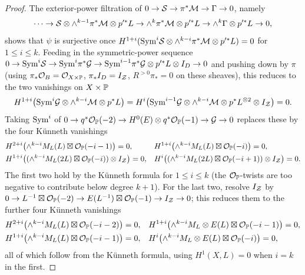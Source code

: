 \begin{proof}
  The exterior-power filtration of \(0\to\mathcal{S}\to\pi^*\mathcal{M}\to\Gamma\to0\), namely
  \[
    \dots\to\mathcal{S}\otimes\wedge^{k-1}\pi^*\mathcal{M}\otimes p'^*L
      \to\wedge^k\pi^*\mathcal{M}\otimes p'^*L\to\wedge^k\Gamma\otimes p'^*L\to0 ,
  \]
  shows that \(\psi\) is surjective once
  \(H^{1+i}(\mathrm{Sym}^i\mathcal{S}\otimes\wedge^{k-i}\pi^*\mathcal{M}\otimes p'^*L)=0\) for
  \(1\le i\le k\).  Feeding in the symmetric-power sequence
  \(0\to\mathrm{Sym}^i\mathcal{S}\to\mathrm{Sym}^i\pi^*\mathcal{G}\to\mathrm{Sym}^{i-1}\pi^*\mathcal{G}\otimes p'^*L\otimes I_D\to0\)
  and pushing down by \(\pi\) (using \(\pi_*\mathcal{O}_B=\mathcal{O}_{X\times\mathbb{P}}\),
  \(\pi_*I_D=I_{\mathcal{Z}}\), \(R^{>0}\pi_*=0\) on these sheaves), this reduces to the
  two vanishings on \(X\times\mathbb{P}\)
  \[
    H^{1+i}\bigl(\mathrm{Sym}^i\mathcal{G}\otimes\wedge^{k-i}\mathcal{M}\otimes p^*L\bigr)
      =H^i\bigl(\mathrm{Sym}^{i-1}\mathcal{G}\otimes\wedge^{k-i}\mathcal{M}\otimes p^*L^{\otimes2}
       \otimes I_{\mathcal{Z}}\bigr)=0 .
  \]
  Taking \(\mathrm{Sym}^i\) of
  \(0\to q^*\mathcal{O}_{\mathbb{P}}(-2)\to H^0(E)\otimes q^*\mathcal{O}_{\mathbb{P}}(-1)\to\mathcal{G}\to0\) replaces
  these by the four Künneth vanishings
  \begin{align*}
    &H^{2+i}\bigl(\wedge^{k-i}M_L(L)\boxtimes\mathcal{O}_{\mathbb{P}}(-i-1)\bigr)=0,
    &&H^{1+i}\bigl(\wedge^{k-i}M_L(L)\boxtimes\mathcal{O}_{\mathbb{P}}(-i)\bigr)=0,\\
    &H^{1+i}\bigl((\wedge^{k-i}M_L(2L)\boxtimes\mathcal{O}_{\mathbb{P}}(-i))\otimes I_{\mathcal{Z}}\bigr)=0,
    &&H^i\bigl((\wedge^{k-i}M_L(2L)\boxtimes\mathcal{O}_{\mathbb{P}}(-i+1))\otimes I_{\mathcal{Z}}\bigr)=0.
  \end{align*}
  The first two hold by the Künneth formula for \(1\le i\le k\) (the
  \(\mathcal{O}_{\mathbb{P}}\)-twists are too negative to contribute below degree \(k+1\)).  For
  the last two, resolve \(I_{\mathcal{Z}}\) by
  \(0\to L^{-1}\boxtimes\mathcal{O}_{\mathbb{P}}(-2)\to E(L^{-1})\boxtimes\mathcal{O}_{\mathbb{P}}(-1)
   \to I_{\mathcal{Z}}\to0\); this reduces them to the further four Künneth vanishings
  \begin{align*}
    &H^{2+i}\bigl(\wedge^{k-i}M_L(L)\boxtimes\mathcal{O}_{\mathbb{P}}(-i-2)\bigr)=0,
    &&H^{1+i}\bigl(\wedge^{k-i}M_L\otimes E(L)\boxtimes\mathcal{O}_{\mathbb{P}}(-i-1)\bigr)=0,\\
    &H^{1+i}\bigl(\wedge^{k-i}M_L(L)\boxtimes\mathcal{O}_{\mathbb{P}}(-i-1)\bigr)=0,
    &&H^i\bigl(\wedge^{k-i}M_L\otimes E(L)\boxtimes\mathcal{O}_{\mathbb{P}}(-i)\bigr)=0,
  \end{align*}
  all of which follow from the Künneth formula, using \(H^1(X,L)=0\) when
  \(i=k\) in the first.
\end{proof}

